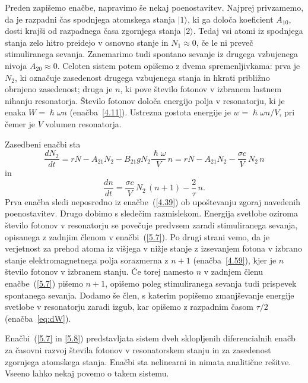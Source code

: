 Preden zapišemo enačbe, napravimo še nekaj poenostavitev. Najprej privzamemo, 
da je razpadni čas spodnjega atomskega stanja $|1\rangle$, 
ki ga določa koeficient $A_{10}$, dosti krajši od razpadnega
časa zgornjega stanja $|2\rangle$. Tedaj vsi atomi iz spodnjega stanja zelo 
hitro preidejo v osnovno stanje in $N_1 \approx 0$, če le ni preveč
stimuliranega sevanja. Zanemarimo tudi spontano sevanje iz drugega vzbujenega
nivoja $A_{20} \approx 0$. Celoten sistem potem opišemo z dvema 
spremenljivkama: prva je $N_2$, ki označuje zasedenost drugega vzbujenega
stanja in hkrati približno obrnjeno zasedenost; druga je $n$, ki pove število
fotonov v izbranem lastnem nihanju resonatorja. Število fotonov določa energijo 
polja v resonatorju, ki je enaka $W = \hslash\omega n$ (enačba~\ref{4.11}). Ustrezna
gostota energije je $w = \hslash\omega n/V$, pri čemer je $V$ volumen resonatorja.

Zasedbeni enačbi sta
\begin{equation}
\frac{dN_2}{dt}=rN-A_{21}N_2-B_{21}gN_2\frac{\hslash \omega}{V}\,n
=rN-A_{21}N_2-\frac{\sigma c}{V}\, N_2\,n
\label{5.7}
\end{equation}
in 
\begin{equation}
\frac{dn}{dt}=\frac{\sigma c}{V}\, N_2\,(n+1)-\frac{2}{\tau}\,n.
\label{5.8}
\end{equation}
Prva enačba sledi neposredno iz enačbe~(\ref{4.39}) ob upoštevanju zgoraj navedenih
poenostavitev. Drugo  dobimo s sledečim razmislekom. Energija svetlobe 
oziroma število fotonov v resonatorju se povečuje predvsem 
zaradi stimuliranega sevanja, opisanega z zadnjim členom v enačbi~(\ref{5.7}).
Po drugi strani vemo, da je verjetnost za prehod atoma iz višjega v nižje stanje z 
izsevanjem fotona v izbrano stanje elektromagnetnega polja sorazmerna z 
$n+1$ (enačba~\ref{4.59}), kjer je $n$ število fotonov v izbranem stanju. 
Če torej namesto $n$ v zadnjem členu enačbe~(\ref{5.7}) pišemo $n+1$, 
opišemo poleg stimuliranega sevanja tudi prispevek spontanega sevanja. Dodamo še 
člen, s katerim popišemo zmanjševanje energije svetlobe v resonatorju zaradi 
izgub, kar opišemo z razpadnim časom $\tau/2$ (enačba~\ref{eq:dW}). 

Enačbi~(\ref{5.7} in \ref{5.8}) predstavljata sistem dveh sklopljenih diferencialnih enačb za 
časovni razvoj števila fotonov v resonatorskem stanju in za zasedenost 
zgornjega atomskega stanja. Enačbi sta nelinearni in nimata  
analitične rešitve. Vseeno lahko nekaj povemo o takem sistemu.

